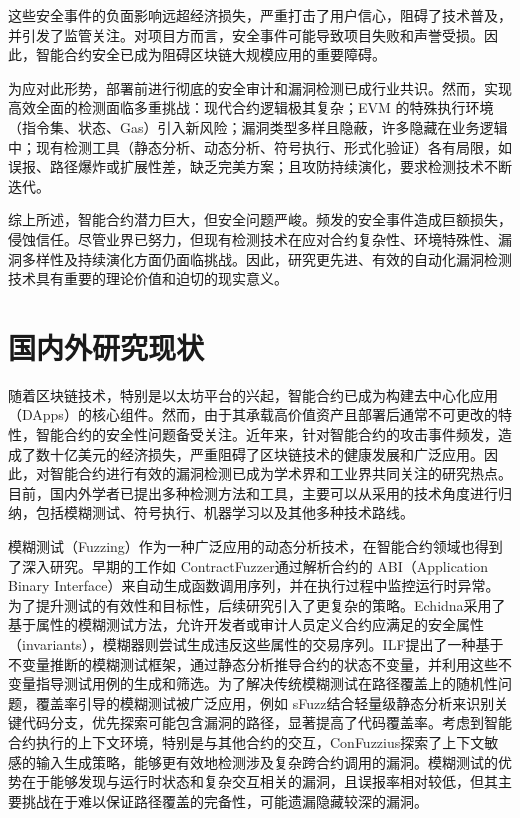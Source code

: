 \documentclass[print, master, vlined, timesmath]{DissertUESTC}
\begin{document}
这些安全事件的负面影响远超经济损失，严重打击了用户信心，阻碍了技术普及，并引发了监管关注\cite{}。对项目方而言，安全事件可能导致项目失败和声誉受损。因此，智能合约安全已成为阻碍区块链大规模应用的重要障碍。

为应对此形势，部署前进行彻底的安全审计和漏洞检测已成行业共识\cite{}。然而，实现高效全面的检测面临多重挑战：现代合约逻辑极其复杂；EVM 的特殊执行环境（指令集、状态、Gas）引入新风险；漏洞类型多样且隐蔽\cite{}\cite{}，许多隐藏在业务逻辑中；现有检测工具（静态分析、动态分析、符号执行、形式化验证\cite{}）各有局限，如误报、路径爆炸\cite{}或扩展性差，缺乏完美方案；且攻防持续演化，要求检测技术不断迭代。

综上所述，智能合约潜力巨大，但安全问题严峻。频发的安全事件造成巨额损失，侵蚀信任。尽管业界已努力，但现有检测技术在应对合约复杂性、环境特殊性、漏洞多样性及持续演化方面仍面临挑战。因此，研究更先进、有效的自动化漏洞检测技术具有重要的理论价值和迫切的现实意义。


\section{国内外研究现状}

随着区块链技术，特别是以太坊平台的兴起，智能合约已成为构建去中心化应用（DApps）的核心组件。然而，由于其承载高价值资产且部署后通常不可更改的特性，智能合约的安全性问题备受关注。近年来，针对智能合约的攻击事件频发，造成了数十亿美元的经济损失\cite{}，严重阻碍了区块链技术的健康发展和广泛应用。因此，对智能合约进行有效的漏洞检测已成为学术界和工业界共同关注的研究热点。目前，国内外学者已提出多种检测方法和工具，主要可以从采用的技术角度进行归纳，包括模糊测试、符号执行、机器学习以及其他多种技术路线。

模糊测试（Fuzzing）作为一种广泛应用的动态分析技术，在智能合约领域也得到了深入研究。早期的工作如 ContractFuzzer\cite{}通过解析合约的 ABI（Application Binary Interface）来自动生成函数调用序列，并在执行过程中监控运行时异常。为了提升测试的有效性和目标性，后续研究引入了更复杂的策略。Echidna\cite{}采用了基于属性的模糊测试方法，允许开发者或审计人员定义合约应满足的安全属性（invariants），模糊器则尝试生成违反这些属性的交易序列。ILF\cite{}提出了一种基于不变量推断的模糊测试框架，通过静态分析推导合约的状态不变量，并利用这些不变量指导测试用例的生成和筛选。为了解决传统模糊测试在路径覆盖上的随机性问题，覆盖率引导的模糊测试被广泛应用，例如 sFuzz\cite{}结合轻量级静态分析来识别关键代码分支，优先探索可能包含漏洞的路径，显著提高了代码覆盖率。考虑到智能合约执行的上下文环境，特别是与其他合约的交互，ConFuzzius\cite{}探索了上下文敏感的输入生成策略，能够更有效地检测涉及复杂跨合约调用的漏洞。模糊测试的优势在于能够发现与运行时状态和复杂交互相关的漏洞，且误报率相对较低，但其主要挑战在于难以保证路径覆盖的完备性，可能遗漏隐藏较深的漏洞。
\end{document}

